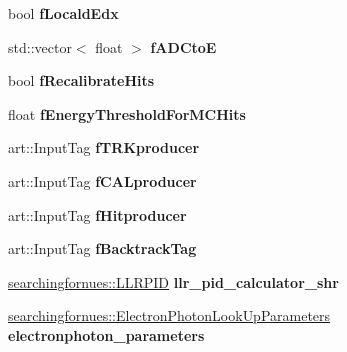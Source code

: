 \begin{DoxyCompactItemize}
\item 
bool {\bfseries f\+Locald\+Edx}\hypertarget{classanalysis_1_1Pi0Tagger_a593e0e3914197078f3f4f6e7fecfe302}{}\label{classanalysis_1_1Pi0Tagger_a593e0e3914197078f3f4f6e7fecfe302}

\item 
std\+::vector$<$ float $>$ {\bfseries f\+A\+D\+CtoE}\hypertarget{classanalysis_1_1Pi0Tagger_a31be7cb14760685c577ce9ea3c342716}{}\label{classanalysis_1_1Pi0Tagger_a31be7cb14760685c577ce9ea3c342716}

\item 
bool {\bfseries f\+Recalibrate\+Hits}\hypertarget{classanalysis_1_1Pi0Tagger_a7f5a28dafc81640cd4fca7a13ff6d4d7}{}\label{classanalysis_1_1Pi0Tagger_a7f5a28dafc81640cd4fca7a13ff6d4d7}

\item 
float {\bfseries f\+Energy\+Threshold\+For\+M\+C\+Hits}\hypertarget{classanalysis_1_1Pi0Tagger_ab95434df6e9fbe68c7aa096e7b531a67}{}\label{classanalysis_1_1Pi0Tagger_ab95434df6e9fbe68c7aa096e7b531a67}

\item 
art\+::\+Input\+Tag {\bfseries f\+T\+R\+Kproducer}\hypertarget{classanalysis_1_1Pi0Tagger_a997843cbe3b9dbfb374f23ad8795b55e}{}\label{classanalysis_1_1Pi0Tagger_a997843cbe3b9dbfb374f23ad8795b55e}

\item 
art\+::\+Input\+Tag {\bfseries f\+C\+A\+Lproducer}\hypertarget{classanalysis_1_1Pi0Tagger_ab05016a8c9679ad42d06ed52c3d88b77}{}\label{classanalysis_1_1Pi0Tagger_ab05016a8c9679ad42d06ed52c3d88b77}

\item 
art\+::\+Input\+Tag {\bfseries f\+Hitproducer}\hypertarget{classanalysis_1_1Pi0Tagger_a6b61dfd6bc20df6b3df369ca1fe3675b}{}\label{classanalysis_1_1Pi0Tagger_a6b61dfd6bc20df6b3df369ca1fe3675b}

\item 
art\+::\+Input\+Tag {\bfseries f\+Backtrack\+Tag}\hypertarget{classanalysis_1_1Pi0Tagger_a70b05d18f2ac1473776e2fab2414c5ad}{}\label{classanalysis_1_1Pi0Tagger_a70b05d18f2ac1473776e2fab2414c5ad}

\item 
\hyperlink{classsearchingfornues_1_1LLRPID}{searchingfornues\+::\+L\+L\+R\+P\+ID} {\bfseries llr\+\_\+pid\+\_\+calculator\+\_\+shr}\hypertarget{classanalysis_1_1Pi0Tagger_ac05ed1c02bf351445552801de9714491}{}\label{classanalysis_1_1Pi0Tagger_ac05ed1c02bf351445552801de9714491}

\item 
\hyperlink{structsearchingfornues_1_1ElectronPhotonLookUpParameters}{searchingfornues\+::\+Electron\+Photon\+Look\+Up\+Parameters} {\bfseries electronphoton\+\_\+parameters}\hypertarget{classanalysis_1_1Pi0Tagger_a2e2215aa2c1dd2a56b5ce039a53d92bd}{}\label{classanalysis_1_1Pi0Tagger_a2e2215aa2c1dd2a56b5ce039a53d92bd}


\end{DoxyCompactItemize}

